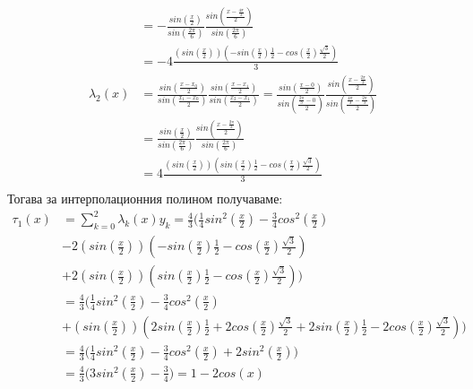 \documentclass[12pt]{article}
\begin{document}
\begin{align*}
        &=-\frac{sin\left(\frac{x}{2}\right)}{sin\left(\frac{2\pi}{6}\right)}\frac{sin\left(\frac{x-\frac{4\pi}{3}}{2}\right)}{sin\left(\frac{2\pi}{6}\right)}\\
        &=-4\frac{\left(sin\left(\frac{x}{2}\right)\right)
        \left(-sin\left(\frac{x}{2}\right)\frac{1}{2}-cos\left(\frac{x}{2}\right)\frac{\sqrt3}{2}\right)}{3}\\
        \lambda_2(x)&=\frac{sin\left(\frac{x-x_0}{2}\right)}{sin\left(\frac{x_1-x_0}{2}\right)}\frac{sin\left(\frac{x-x_1}{2}\right)}{sin\left(\frac{x_2-x_1}{2}\right)} = \frac{sin\left(\frac{x-0}{2}\right)}{sin\left(\frac{\frac{2\pi}{3}-0}{2}\right)}\frac{sin\left(\frac{x-\frac{2\pi}{3}}{2}\right)}{sin\left(\frac{\frac{4\pi}{3}-\frac{2\pi}{3}}{2}\right)} \\
        &=\frac{sin\left(\frac{x}{2}\right)}{sin\left(\frac{2\pi}{6}\right)}\frac{sin\left(\frac{x-\frac{2\pi}{3}}{2}\right)}{sin\left(\frac{2\pi}{6}\right)} \\
        &=4\frac{\left(sin\left(\frac{x}{2}\right)\right)
        \left(sin\left(\frac{x}{2}\right)\frac{1}{2}-cos\left(\frac{x}{2}\right)\frac{\sqrt3}{2}\right)}{3}\\
        \end{align*}
        Тогава за интерполационния полином получаваме:
        \begin{align*}
        \tau_1(x)&=\sum_{k=0}^{2}\lambda_k(x)y_k =  \frac{4}{3}\Biggl(
        \frac{1}{4}sin^2\left(\frac{x}{2}\right)-\frac{3}{4}cos^2\left(\frac{x}{2}\right)\\
        &-2\left(sin\left(\frac{x}{2}\right)\right)
        \left(-sin\left(\frac{x}{2}\right)\frac{1}{2}-cos\left(\frac{x}{2}\right)\frac{\sqrt3}{2}\right)\\&+2\left(sin\left(\frac{x}{2}\right)\right)
        \left(sin\left(\frac{x}{2}\right)\frac{1}{2}-cos\left(\frac{x}{2}\right)\frac{\sqrt3}{2}\right)\Biggr)\\
        &=\frac{4}{3}\Biggl(\frac{1}{4}sin^2\left(\frac{x}{2}\right)-\frac{3}{4}cos^2\left(\frac{x}{2}\right)\\
        &+\left(sin\left(\frac{x}{2}\right)\right)
        \left(2sin\left(\frac{x}{2}\right)\frac{1}{2}+2cos\left(\frac{x}{2}\right)\frac{\sqrt3}{2}
        +2sin\left(\frac{x}{2}\right)\frac{1}{2}-2cos\left(\frac{x}{2}\right)\frac{\sqrt3}{2}\right)\Biggr)\\
        &=\frac{4}{3}\Biggl(\frac{1}{4}sin^2\left(\frac{x}{2}\right)-\frac{3}{4}cos^2\left(\frac{x}{2}\right)+2sin^2\left(\frac{x}{2}\right)\Biggr)\\
        &=\frac{4}{3}\biggl(3sin^2\left(\frac{x}{2}\right)-\frac{3}{4}\biggr)=
        \boxed{1-2cos(x)}
        \end{align*}
\end{document}
